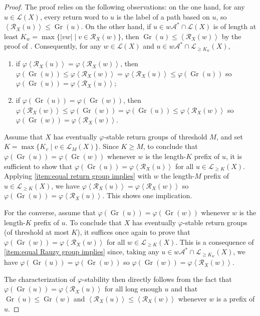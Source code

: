 \documentclass{amsart}
\newcommand*{\ret}{\mathcal{R}}
\newcommand*{\lang}{\mathcal{L}}
\newcommand*{\cA}{\mathcal{A}}
\newcommand*{\Gr}{\operatorname{Gr}}
\newcommand*{\gen}[1]{\left\langle #1\right\rangle}
\theoremstyle{plain}
\theoremstyle{definition}
\theoremstyle{remark}
\begin{document}
\begin{proof}
    The proof relies on the following observations: 
    on the one hand, for any $u \in \lang(X)$, every return word to $u$ is the label of a path based on $u$, so $\gen{\ret_X(u)} \leq \Gr(u)$. On the other hand, if $u \in w\cA^* \cap \lang(X)$ is of length at least $K_w = \max\{|vw| \mid v \in \ret_X(w)\}$, then $\Gr(u) \leq \gen{\ret_X(w)}$ by the proof of \cite[Theorem 4.7]{Berthe2015}.
    Consequently, for any $w \in \lang(X)$ and $u \in w\cA^* \cap \lang_{\geq K_w}(X)$,
    \begin{enumerate}
        \item if $\varphi\gen{\ret_X(u)} = \varphi\gen{\ret_X(w)}$, then $\varphi(\Gr(u)) \leq \varphi\gen{\ret_X(w)} = \varphi\gen{\ret_X(u)} \leq \varphi(\Gr(u))$ so $\varphi(\Gr(u)) = \varphi\gen{\ret_X(u)}$;\label{item:equal return group implies}
        \item if $\varphi(\Gr(u)) = \varphi(\Gr(w))$, then $\varphi\gen{\ret_X(w)} \leq \varphi(\Gr(w)) = \varphi(\Gr(u)) \leq \varphi\gen{\ret_X(w)}$ so $\varphi(\Gr(w)) = \varphi\gen{\ret_X(w)}$.\label{item:equal Rauzy group implies}
    \end{enumerate}
    Assume that $X$ has eventually $\varphi$-stable return groups of threshold $M$, and set $K = \max\{K_v \mid v \in \lang_M(X)\}$. Since $K \geq M$, to conclude that $\varphi(\Gr(u)) = \varphi(\Gr(w))$ whenever $w$ is the length-$K$ prefix of $u$, it is sufficient to show that $\varphi(\Gr(u)) = \varphi\gen{\ret_X(u)}$ for all $u \in \lang_{\geq K}(X)$.
    Applying \cref{item:equal return group implies} with $w$ the length-$M$ prefix of $u \in \lang_{\geq K}(X)$, we have $\varphi\gen{\ret_X(u)} = \varphi\gen{\ret_X(w)}$ so $\varphi(\Gr(u)) = \varphi\gen{\ret_X(u)}$. This shows one implication.
    
    For the converse, assume that $\varphi(\Gr(u)) = \varphi(\Gr(w))$ whenever $w$ is the length-$K$ prefix of $u$. To conclude that $X$ has eventually $\varphi$-stable return groups (of threshold at most $K$), it suffices once again to prove that $\varphi(\Gr(w)) = \varphi\gen{\ret_X(w)}$ for all $w \in \lang_{\geq K}(X)$. This is a consequence of \cref{item:equal Rauzy group implies} since, taking any $u \in w\cA^* \cap \lang_{\geq K_w}(X)$, we have $\varphi(\Gr(u)) = \varphi(\Gr(w))$ so $\varphi(\Gr(w)) = \varphi\gen{\ret_X(w)}$.

    The characterization of $\varphi$-stability then directly follows from the fact that $\varphi(\Gr(u)) = \varphi\gen{\ret_X(u)}$ for all long enough $u$ and that $\Gr(u) \leq \Gr(w)$ and $\gen{\ret_X(u)} \leq \gen{\ret_X(w)}$ whenever $w$ is a prefix of $u$.
\end{proof}
\end{document}
